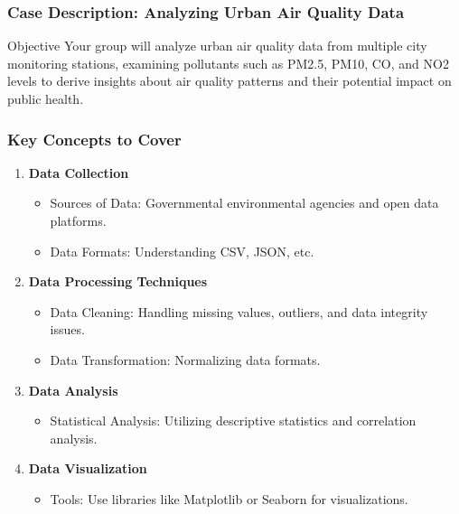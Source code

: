 \documentclass[aspectratio=169]{beamer}
\begin{document}
\begin{frame}[fragile]
    \frametitle{Case Description: Analyzing Urban Air Quality Data}
    \begin{block}{Objective}
        Your group will analyze urban air quality data from multiple city monitoring stations, examining pollutants such as PM2.5, PM10, CO, and NO2 levels to derive insights about air quality patterns and their potential impact on public health.
    \end{block}
\end{frame}

\begin{frame}[fragile]
    \frametitle{Key Concepts to Cover}
    \begin{enumerate}
        \item \textbf{Data Collection}
            \begin{itemize}
                \item Sources of Data: Governmental environmental agencies and open data platforms.
                \item Data Formats: Understanding CSV, JSON, etc.
            \end{itemize}
        
        \item \textbf{Data Processing Techniques}
            \begin{itemize}
                \item Data Cleaning: Handling missing values, outliers, and data integrity issues.
                \item Data Transformation: Normalizing data formats.
            \end{itemize}

        \item \textbf{Data Analysis}
            \begin{itemize}
                \item Statistical Analysis: Utilizing descriptive statistics and correlation analysis.
            \end{itemize}
        
        \item \textbf{Data Visualization}
            \begin{itemize}
                \item Tools: Use libraries like Matplotlib or Seaborn for visualizations.
            \end{itemize}
    \end{enumerate}
\end{frame}
\end{document}
